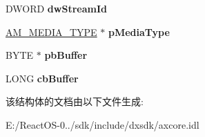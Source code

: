 \begin{DoxyCompactItemize}
D\+W\+O\+RD {\bfseries dw\+Stream\+Id}
\item 
\mbox{\label{structtag_a_m___s_a_m_p_l_e2___p_r_o_p_e_r_t_i_e_s_a093f351fefdb0ade0a5bf9c63b43ffdf}} 
\hyperlink{struct_a_m___m_e_d_i_a___t_y_p_e}{A\+M\+\_\+\+M\+E\+D\+I\+A\+\_\+\+T\+Y\+PE} $\ast$ {\bfseries p\+Media\+Type}
\item 
\mbox{\label{structtag_a_m___s_a_m_p_l_e2___p_r_o_p_e_r_t_i_e_s_a5f73f683f7efb11744d606bf94a5642a}} 
B\+Y\+TE $\ast$ {\bfseries pb\+Buffer}
\item 
\mbox{\label{structtag_a_m___s_a_m_p_l_e2___p_r_o_p_e_r_t_i_e_s_abf3c45eadc15a45ab0a1d52b57ca3bf4}} 
L\+O\+NG {\bfseries cb\+Buffer}
\end{DoxyCompactItemize}


该结构体的文档由以下文件生成\+:\begin{DoxyCompactItemize}
\item 
E\+:/\+React\+O\+S-\/0../sdk/include/dxsdk/axcore.\+idl\end{DoxyCompactItemize}
